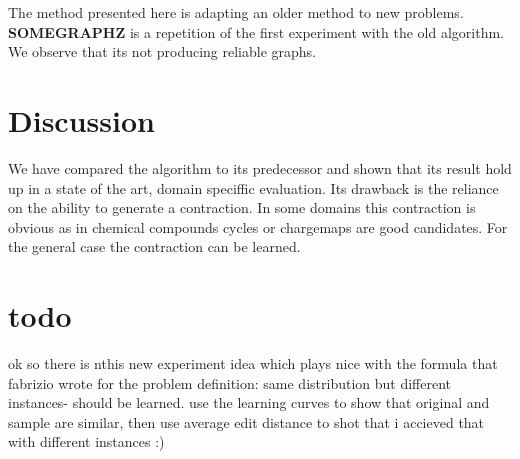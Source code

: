 \documentclass{article}
\begin{document}
The method presented here is adapting an older method to new problems.
\textbf{SOMEGRAPHZ} is a repetition of the first experiment with 
the old algorithm. We observe that its not producing reliable
graphs.

\section{Discussion} 
We have compared the algorithm to its predecessor and shown
that its result hold up in a state of the art, domain speciffic
evaluation. Its drawback is the reliance on the ability to 
generate a contraction. In some domains this contraction is 
obvious as in chemical compounds cycles or chargemaps are good candidates.
For the general case the contraction can be learned.

\section{todo}
ok so there is nthis new experiment idea which plays nice with 
the formula that fabrizio wrote for the problem definition:
same distribution but different instances- should be learned. 
use the learning curves to show that original and sample are 
similar, then use average edit distance to shot that i accieved that 
with different instances :) 
\end{document}
